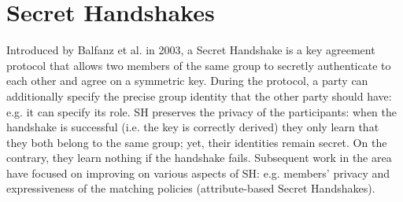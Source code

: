 \section{Secret Handshakes}\label{sec:sh}

Introduced by Balfanz et al. \cite{Balfanz} in 2003, a Secret Handshake is a key agreement protocol that allows two members of the same group to secretly authenticate to each other and agree on a symmetric key.
During the protocol, a party can additionally specify the precise group identity that the other party should have: e.g. it can specify its role.
\newline\newline
SH preserves the privacy of the participants: when the handshake is successful (i.e. the key is correctly derived) they only learn that they both belong to the same group; yet, their identities remain secret.
On the contrary, they learn nothing if the handshake fails.
\newline\newline
Subsequent work in the area have focused on improving on various aspects of SH: e.g. members' privacy and expressiveness of the matching policies (attribute-based Secret Handshakes).
